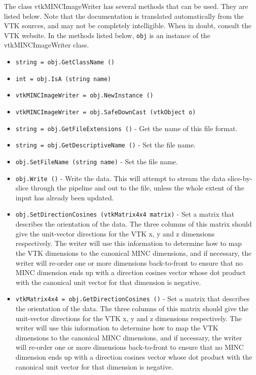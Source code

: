 The class vtkMINCImageWriter has several methods that can be used.
  They are listed below.
Note that the documentation is translated automatically from the VTK sources,
and may not be completely intelligible.  When in doubt, consult the VTK website.
In the methods listed below, \verb|obj| is an instance of the vtkMINCImageWriter class.
\begin{itemize}
\item  \verb|string = obj.GetClassName ()|

\item  \verb|int = obj.IsA (string name)|

\item  \verb|vtkMINCImageWriter = obj.NewInstance ()|

\item  \verb|vtkMINCImageWriter = obj.SafeDownCast (vtkObject o)|

\item  \verb|string = obj.GetFileExtensions ()| -  Get the name of this file format.

\item  \verb|string = obj.GetDescriptiveName ()| -  Set the file name.

\item  \verb|obj.SetFileName (string name)| -  Set the file name.

\item  \verb|obj.Write ()| -  Write the data.  This will attempt to stream the data
 slice-by-slice through the pipeline and out to the file,
 unless the whole extent of the input has already been
 updated.

\item  \verb|obj.SetDirectionCosines (vtkMatrix4x4 matrix)| -  Set a matrix that describes the orientation of the data.  The
 three columns of this matrix should give the unit-vector
 directions for the VTK x, y and z dimensions respectively.  
 The writer will use this information to determine how to map
 the VTK dimensions to the canonical MINC dimensions, and if
 necessary, the writer will re-order one or more dimensions
 back-to-front to ensure that no MINC dimension ends up with
 a direction cosines vector whose dot product with the canonical
 unit vector for that dimension is negative.

\item  \verb|vtkMatrix4x4 = obj.GetDirectionCosines ()| -  Set a matrix that describes the orientation of the data.  The
 three columns of this matrix should give the unit-vector
 directions for the VTK x, y and z dimensions respectively.  
 The writer will use this information to determine how to map
 the VTK dimensions to the canonical MINC dimensions, and if
 necessary, the writer will re-order one or more dimensions
 back-to-front to ensure that no MINC dimension ends up with
 a direction cosines vector whose dot product with the canonical
 unit vector for that dimension is negative.


\end{itemize}
